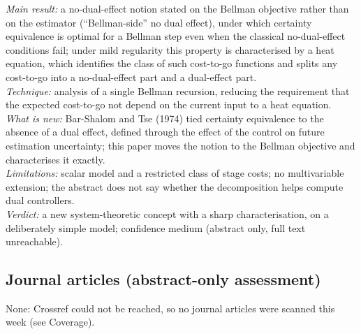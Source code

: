 \documentclass[11pt,a4paper]{article}
\begin{document}
\begin{enumerate}[leftmargin=*]
  \emph{Main result:} a no-dual-effect notion stated on the Bellman objective rather than on the estimator (``Bellman-side'' no dual effect), under which certainty equivalence is optimal for a Bellman step even when the classical no-dual-effect conditions fail; under mild regularity this property is characterised by a heat equation, which identifies the class of such cost-to-go functions and splits any cost-to-go into a no-dual-effect part and a dual-effect part.\\
  \emph{Technique:} analysis of a single Bellman recursion, reducing the requirement that the expected cost-to-go not depend on the current input to a heat equation.\\
  \emph{What is new:} Bar-Shalom and Tse (1974) tied certainty equivalence to the absence of a dual effect, defined through the effect of the control on future estimation uncertainty; this paper moves the notion to the Bellman objective and characterises it exactly.\\
  \emph{Limitations:} scalar model and a restricted class of stage costs; no multivariable extension; the abstract does not say whether the decomposition helps compute dual controllers.\\
  \emph{Verdict:} a new system-theoretic concept with a sharp characterisation, on a deliberately simple model; confidence medium (abstract only, full text unreachable).
\end{enumerate}

\subsection*{Journal articles (abstract-only assessment)}
None: Crossref could not be reached, so no journal articles were scanned this week (see Coverage).
\end{document}
